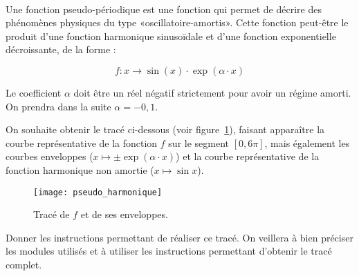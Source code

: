 \exer{[PLT-001]}
\setcounter{numques}{0}~\\

Une fonction pseudo-périodique est une fonction qui permet de décrire des phénomènes physiques du type «oscillatoire-amortis». Cette fonction peut-être le produit d'une fonction harmonique sinusoïdale et d'une fonction exponentielle décroissante, de la forme : 

\begin{equation*}
f:x\to \sin(x)\cdot \exp \left(\alpha \cdot x\right)
\end{equation*}


Le coefficient $\alpha$ doit être un réel négatif strictement pour avoir un régime amorti. On prendra dans la suite $\alpha=-0,1$. 

\bigskip{}
On souhaite obtenir le tracé ci-dessous (voir figure~\ref{PLT-001:fig:amorti}), faisant apparaître la courbe représentative de la fonction $f$ sur le segment $[0,6\pi]$, mais également les courbes enveloppes ($x\mapsto \pm \exp \left(\alpha \cdot x\right)$) et la courbe représentative de la fonction harmonique non amortie ($x\mapsto \sin x$).

\begin{figure}[h!]
\begin{center}
\texttt{[image: pseudo\_harmonique]}
\caption{Tracé de $f$ et de ses enveloppes.}
\label{PLT-001:fig:amorti}
\end{center}
\end{figure}


\question{} Donner les instructions permettant de réaliser ce tracé. On veillera à bien préciser les modules utilisés et à utiliser les instructions permettant d'obtenir le tracé complet.
